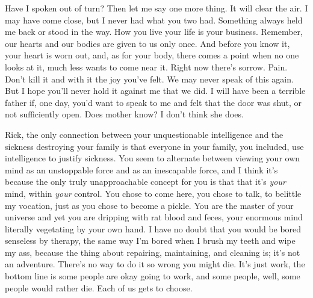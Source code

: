 \documentclass[../butidigress.tex]{subfiles}
\begin{document}
\begin{drama}
\perlmanspeaks{} Have I spoken out of turn?
\perlmanspeaks{} Then let me say one more thing. It will clear the air. I may have come close, but I never had what you two had. Something always held me back or stood in the way. How you live your life is your business. Remember, our hearts and our bodies are given to us only once. And before you know it, your heart is worn out, and, as for your body, there comes a point when no one looks at it, much less wants to come near it. Right now there's sorrow. Pain. Don't kill it and with it the joy you've felt.
\perlmanspeaks{} We may never speak of this again. But I hope you'll never hold it against me that we did. I will have been a terrible father if, one day, you'd want to speak to me and felt that the door was shut, or not sufficiently open.
\eliospeaks Does mother know?
\perlmanspeaks I don't think she does.
\end{drama}

\newpage

\begin{drama}
\wongspeaks Rick, the only connection between your unquestionable intelligence and the sickness destroying your family is that everyone in your family, you included, use intelligence to justify sickness. You seem to alternate between viewing your own mind as an unstoppable force and as an inescapable force, and I think it's because the only truly unapproachable concept for you is that that it's \emph{your} mind, within \emph{your} control. You chose to come here, you chose to talk, to belittle my vocation, just as you chose to become a pickle. You are the master of your universe and yet you are dripping with rat blood and feces, your enormous mind literally vegetating by your own hand. I have no doubt that you would be bored senseless by therapy, the same way I'm bored when I brush my teeth and wipe my ass, because the thing about repairing, maintaining, and cleaning is; it's not an adventure. There's no way to do it so wrong you might die. It's just work, the bottom line is some people are okay going to work, and some people, well, some people would rather die. Each of us gets to choose.
\end{drama}
\end{document}
